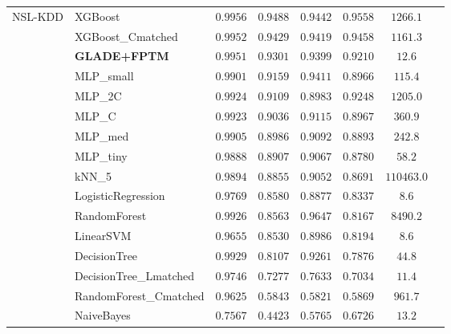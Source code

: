\documentclass[journal,10pt]{IEEEtran}
\begin{document}
\begin{longtable}{llcccccr}
\multirow{16}{*}{NSL-KDD}
 & XGBoost                & $0.9956$ & $0.9488$ & $0.9442$ & $0.9558$ & $1266.1$   \\
 & XGBoost\_Cmatched      & $0.9952$ & $0.9429$ & $0.9419$ & $0.9458$ & $1161.3$   \\
 & \textbf{GLADE+FPTM}    & $\mathbf{0.9951}$ & $\mathbf{0.9301}$ & $\mathbf{0.9399}$ & $\mathbf{0.9210}$ & $\mathbf{12.6}$ \\
 & MLP\_small             & $0.9901$ & $0.9159$ & $0.9411$ & $0.8966$ & $115.4$    \\
 & MLP\_2C                & $0.9924$ & $0.9109$ & $0.8983$ & $0.9248$ & $1205.0$   \\
 & MLP\_C                 & $0.9923$ & $0.9036$ & $0.9115$ & $0.8967$ & $360.9$    \\
 & MLP\_med               & $0.9905$ & $0.8986$ & $0.9092$ & $0.8893$ & $242.8$    \\
 & MLP\_tiny              & $0.9888$ & $0.8907$ & $0.9067$ & $0.8780$ & $58.2$     \\
 & kNN\_5                 & $0.9894$ & $0.8855$ & $0.9052$ & $0.8691$ & $110463.0$ \\
 & LogisticRegression     & $0.9769$ & $0.8580$ & $0.8877$ & $0.8337$ & $8.6$      \\
 & RandomForest           & $0.9926$ & $0.8563$ & $0.9647$ & $0.8167$ & $8490.2$   \\
 & LinearSVM              & $0.9655$ & $0.8530$ & $0.8986$ & $0.8194$ & $8.6$      \\
 & DecisionTree           & $0.9929$ & $0.8107$ & $0.9261$ & $0.7876$ & $44.8$     \\
 & DecisionTree\_Lmatched & $0.9746$ & $0.7277$ & $0.7633$ & $0.7034$ & $11.4$     \\
 & RandomForest\_Cmatched & $0.9625$ & $0.5843$ & $0.5821$ & $0.5869$ & $961.7$    \\
 & NaiveBayes             & $0.7567$ & $0.4423$ & $0.5765$ & $0.6726$ & $13.2$     \\
\midrule


\end{longtable}
\end{document}
